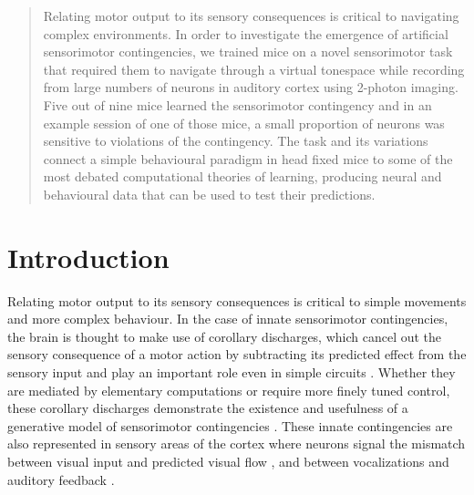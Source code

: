 \documentclass[]{report}
\theoremstyle{definition}
\theoremstyle{definition}
\theoremstyle{definition}
\theoremstyle{remark}
\begin{document}
\setcounter{page}{2}

\doublespacing
\begin{abstract}

Relating motor output to its sensory consequences is critical to navigating complex environments. In order to investigate the emergence of artificial sensorimotor contingencies, we trained mice on a novel sensorimotor task that required them to navigate through a virtual tonespace while recording from large numbers of neurons in auditory cortex using 2-photon imaging. Five out of nine mice learned the sensorimotor contingency and in an example session of one of those mice, a small proportion of neurons was sensitive to violations of the contingency. The task and its variations connect a simple behavioural paradigm in head fixed mice to some of the most debated computational theories of learning, producing neural and behavioural data that can be used to test their predictions. 


\end{abstract}

\tableofcontents

\hypertarget{intro}{%
\chapter{Introduction}\label{intro}}

\setcounter{page}{1}

Relating motor output to its sensory consequences is critical to simple
movements and more complex behaviour. In the case of innate sensorimotor
contingencies, the brain is thought to make use of corollary discharges,
which cancel out the sensory consequence of a motor action by
subtracting its predicted effect from the sensory input and play an
important role even in simple circuits \citep{poulet2003cricket}.
Whether they are mediated by elementary computations or require more
finely tuned control, these corollary discharges demonstrate the
existence and usefulness of a generative model of sensorimotor
contingencies \citep{miall1996forward}. These innate contingencies are
also represented in sensory areas of the cortex where neurons signal the
mismatch between visual input and predicted visual flow
\citep{keller2012sensorimotor, leinweber2017sensorimotor}, and between
vocalizations and auditory feedback \citep{eliades2018auditory}.
\end{document}

